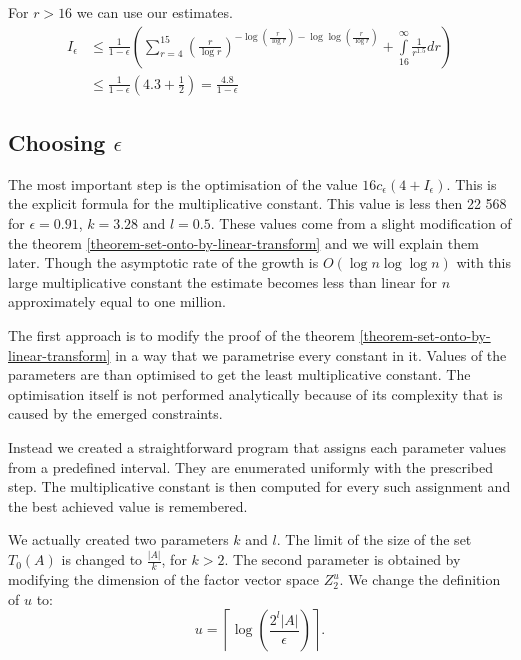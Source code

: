 For $r > 16$ we can use our estimates.
\begin{displaymath}
\begin{split}
I_{\epsilon} 
	& \leq \frac{1}{1 - \epsilon} \left( \displaystyle \sum_{r = 4}^{15} \left(\frac{r}{\log r}\right)^{-\log \left(\frac{r}{\log r}\right) - \log \log \left(\frac{r}{\log r}\right)} + \int\limits_{16}^\infty \frac{1}{r^{1.5}} dr \right) \\
	& \leq \frac{1}{1 - \epsilon} \left(4.3 + \frac{1}{2}\right) = \frac{4.8}{1-\epsilon}
\end{split}
\end{displaymath}

\subsection{Choosing $\epsilon$}
The most important step is the optimisation of the value $16 c_\epsilon (4 + I_{\epsilon})$. This is the explicit formula for the multiplicative constant. This value is less then 22 568 for $\epsilon = 0.91$, $k = 3.28$ and $l = 0.5$. These values come from a slight modification of the theorem \ref{theorem-set-onto-by-linear-transform} and we will explain them later. Though the asymptotic rate of the growth is $O(\log n \log \log n)$ with this large multiplicative constant the estimate becomes less than linear for $n$ approximately equal to one million.

The first approach is to modify the proof of the theorem \ref{theorem-set-onto-by-linear-transform} in a way that we parametrise every constant in it. Values of the parameters are than optimised to get the least multiplicative constant. The optimisation itself is not performed analytically because of its complexity that is caused by the emerged constraints. 

Instead we created a straightforward program that assigns each parameter values from a predefined interval. They are enumerated uniformly with the prescribed step. The multiplicative constant is then computed for every such assignment and the best achieved value is remembered.

We actually created two parameters $k$ and $l$. The limit of the size of the set $T_0(A)$ is changed to $\frac{|A|}{k}$, for $k > 2$. The second parameter is obtained by modifying the dimension of the factor vector space $Z_2^u$. We change the definition of $u$ to:
\begin{displaymath}
u = \left\lceil \log \left(\frac{2^l |A|}{\epsilon}\right) \right\rceil \textit{.}
\end{displaymath}


